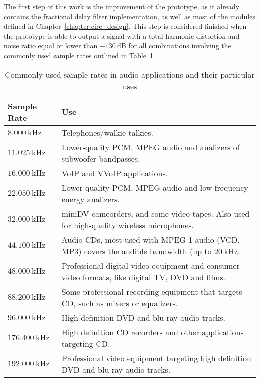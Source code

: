 The first step of this work is the improvement of the prototype, as it already
contains the fractional delay filter implementation, as well as most of the
modules defined in Chapter~\ref{chapter:circ_design}.  This step is considered
finished when the prototype is able to output a signal with a total harmonic
distortion and noise ratio equal or lower than $\SI{-130}{\dB}$ for all
combinations involving the commonly used sample rates outlined in
Table~\ref{tab:common_samp_rates}.


\begin{table}[!htbp]
	\centering
	\caption{Commonly used sample rates in audio applications and their particular uses}
	\label{tab:common_samp_rates}
	\begin{tabular}{|l|p{8cm}|}
		\hline
		\textbf{Sample Rate} & \textbf{Use} \\
		\hline
		$\SI{8.000}{\kilo\hertz}$ & Telephones/walkie-talkies.\\
		\hline
                $\SI{11.025}{\kilo\hertz}$ & Lower-quality PCM, MPEG audio and analizers of subwoofer bandpasses.\\
		\hline
                $\SI{16.000}{\kilo\hertz}$ & VoIP and VVoIP applications.\\
		\hline
                $\SI{22.050}{\kilo\hertz}$ & Lower-quality PCM, MPEG audio and low frequency energy analizers.\\
		\hline
                $\SI{32.000}{\kilo\hertz}$ & miniDV camcorders, and some video tapes. Also used for high-quality wireless microphones.\\
		\hline
                $\SI{44.100}{\kilo\hertz}$ & Audio CDs, most used with MPEG-1 audio (VCD, MP3) covers the audible bandwidth (up to $\SI{20}{\kilo\hertz}$.\\
		\hline
                $\SI{48.000}{\kilo\hertz}$ & Professional digital video equipment and consumer video formats, like digital TV, DVD and films.\\
		\hline
                $\SI{88.200}{\kilo\hertz}$ & Some professional recording equipment that targets CD, such as mixers or equalizers.\\
		\hline
                $\SI{96.000}{\kilo\hertz}$ & High definition DVD and blu-ray audio tracks.\\
		\hline
                $\SI{176.400}{\kilo\hertz}$ & High definition CD recorders and other applications targeting CD.\\
		\hline
                $\SI{192.000}{\kilo\hertz}$ & Professional video equipment targeting high definition DVD and blu-ray audio tracks.\\
		\hline
	\end{tabular}
\end{table}

